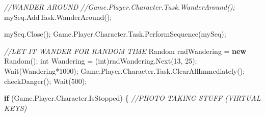 \documentclass[
  openany]{book}
\newenvironment{Shaded}{\begin{snugshade}}{\end{snugshade}}
\newcommand{\CommentTok}[1]{\textcolor[rgb]{0.56,0.35,0.01}{\textit{#1}}}
\newcommand{\DataTypeTok}[1]{\textcolor[rgb]{0.13,0.29,0.53}{#1}}
\newcommand{\DecValTok}[1]{\textcolor[rgb]{0.00,0.00,0.81}{#1}}
\newcommand{\FunctionTok}[1]{\textcolor[rgb]{0.00,0.00,0.00}{#1}}
\newcommand{\KeywordTok}[1]{\textcolor[rgb]{0.13,0.29,0.53}{\textbf{#1}}}
\newcommand{\NormalTok}[1]{#1}
\begin{document}
\begin{Shaded}
\begin{Highlighting}[]
                \CommentTok{//WANDER AROUND}
                \CommentTok{//Game.Player.Character.Task.WanderAround();}
\NormalTok{                mySeq.}\FunctionTok{AddTask}\NormalTok{.}\FunctionTok{WanderAround}\NormalTok{();}
                
\NormalTok{                mySeq.}\FunctionTok{Close}\NormalTok{();}
\NormalTok{                Game.}\FunctionTok{Player}\NormalTok{.}\FunctionTok{Character}\NormalTok{.}\FunctionTok{Task}\NormalTok{.}\FunctionTok{PerformSequence}\NormalTok{(mySeq);}

                \CommentTok{//LET IT WANDER FOR RANDOM TIME}
\NormalTok{                Random rndWandering = }\KeywordTok{new} \FunctionTok{Random}\NormalTok{();}
                \DataTypeTok{int}\NormalTok{ Wandering = (}\DataTypeTok{int}\NormalTok{)rndWandering.}\FunctionTok{Next}\NormalTok{(}\DecValTok{13}\NormalTok{, }\DecValTok{25}\NormalTok{);}
                \FunctionTok{Wait}\NormalTok{(Wandering*}\DecValTok{1000}\NormalTok{);}
\NormalTok{                Game.}\FunctionTok{Player}\NormalTok{.}\FunctionTok{Character}\NormalTok{.}\FunctionTok{Task}\NormalTok{.}\FunctionTok{ClearAllImmediately}\NormalTok{();}
                \FunctionTok{checkDanger}\NormalTok{();}
                \FunctionTok{Wait}\NormalTok{(}\DecValTok{500}\NormalTok{);}

                \KeywordTok{if}\NormalTok{ (Game.}\FunctionTok{Player}\NormalTok{.}\FunctionTok{Character}\NormalTok{.}\FunctionTok{IsStopped}\NormalTok{)}
\NormalTok{                \{}
                    \CommentTok{//PHOTO TAKING STUFF (VIRTUAL KEYS)}
                    

\end{Highlighting}
\end{Shaded}
\end{document}
